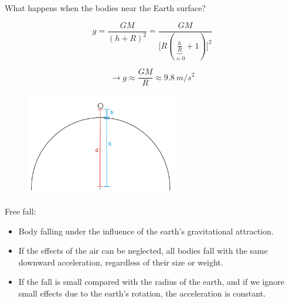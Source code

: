 \documentclass[]{beamer}
\begin{document}


\begin{frame}
   What happens when the bodies near the Earth surface? 
    \pause
    
    \vspace{3mm}

        \begin{equation*}
            g=\frac{GM}{(h+R)^2}=\frac{GM}{\big[R(\underbrace{\frac{h}{R}}_{\approx 0}+1)\big]^2}
        \end{equation*}

        \begin{equation*}
         \rightarrow   g\approx\frac{GM}{R}\approx9.8~m/s^2
        \end{equation*}

        \begin{figure}[h!]  
            \includegraphics[width=0.6\textwidth]{images/6.jpg}
            
          \end{figure}
     
    \end{frame}


\begin{frame}
    Free fall:
    \vspace{3mm}
\begin{itemize}
\item  Body falling under the influence of the earth’s gravitational attraction.
\pause
\item  If the effects of the air can be neglected, all bodies fall with the 
same downward acceleration, regardless of their size or weight.
\pause 
\item If  the fall is small compared with the radius of the earth, and if we ignore small effects due to the
earth’s rotation, the acceleration is constant.
\end{itemize}
 
    

\end{frame}
\end{document}
